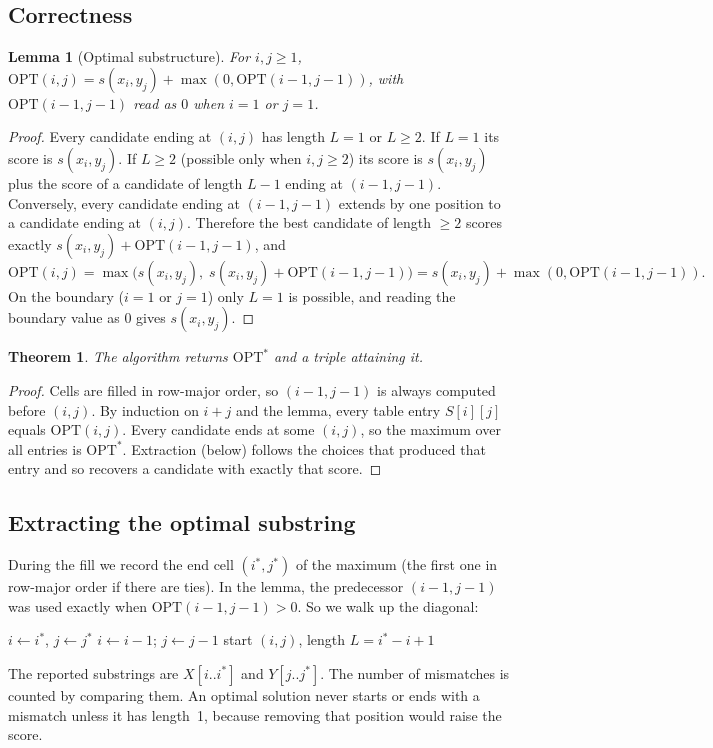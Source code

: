 \documentclass[11pt]{article}
\newtheorem{lemma}{Lemma}
\newtheorem{theorem}{Theorem}
\begin{document}
\subsection{Correctness}
\begin{lemma}[Optimal substructure]
For $i,j\ge1$, $\mathrm{OPT}(i,j) = s(x_i,y_j) + \max(0, \mathrm{OPT}(i-1,j-1))$,
with $\mathrm{OPT}(i-1,j-1)$ read as $0$ when $i=1$ or $j=1$.
\end{lemma}
\begin{proof}
Every candidate ending at $(i,j)$ has length $L=1$ or $L\ge2$.
If $L=1$ its score is $s(x_i,y_j)$.
If $L\ge2$ (possible only when $i,j\ge2$) its score is
$s(x_i,y_j)$ plus the score of a candidate of length $L-1$ ending at
$(i-1,j-1)$. Conversely, every candidate ending at $(i-1,j-1)$ extends by one
position to a candidate ending at $(i,j)$. Therefore the best candidate of
length $\ge2$ scores exactly $s(x_i,y_j)+\mathrm{OPT}(i-1,j-1)$, and
\[
\mathrm{OPT}(i,j) = \max\bigl(s(x_i,y_j),\; s(x_i,y_j)+\mathrm{OPT}(i-1,j-1)\bigr)
               = s(x_i,y_j)+\max(0,\mathrm{OPT}(i-1,j-1)).
\]
On the boundary ($i=1$ or $j=1$) only $L=1$ is possible, and reading the
boundary value as $0$ gives $s(x_i,y_j)$.
\end{proof}
\begin{theorem}
The algorithm returns $\mathrm{OPT}^\ast$ and a triple attaining it.
\end{theorem}
\begin{proof}
Cells are filled in row-major order, so $(i-1,j-1)$ is always computed before
$(i,j)$. By induction on $i+j$ and the lemma, every table entry
$S[i][j]$ equals $\mathrm{OPT}(i,j)$. Every candidate ends at some
$(i,j)$, so the maximum over all entries is $\mathrm{OPT}^\ast$. Extraction
(below) follows the choices that produced that entry and so recovers a
candidate with exactly that score.
\end{proof}

\subsection{Extracting the optimal substring}
During the fill we record the end cell $(i^\ast,j^\ast)$ of the maximum
(the first one in row-major order if there are ties). In the lemma, the
predecessor $(i-1,j-1)$ was used exactly when $\mathrm{OPT}(i-1,j-1)>0$. So
we walk up the diagonal:
\begin{algorithmic}[1]
\State $i\gets i^\ast$, $j\gets j^\ast$
  \State $i\gets i-1$; $j\gets j-1$
\EndWhile
\State \Return start $(i,j)$, length $L=i^\ast-i+1$
\end{algorithmic}
The reported substrings are $X[i..i^\ast]$ and $Y[j..j^\ast]$. The number of
mismatches is counted by comparing them. An optimal solution never starts or
ends with a mismatch unless it has length~1, because removing that position
would raise the score.
\end{document}

